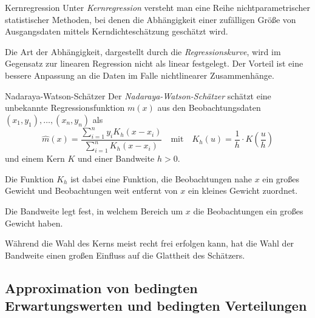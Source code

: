\begin{bonus}{Kernregression}
    Unter \emph{Kernregression} versteht man eine Reihe nichtparametrischer statistischer Methoden, bei denen die Abhängigkeit einer zufälligen Größe von Ausgangsdaten mittels Kerndichteschätzung geschätzt wird.

    Die Art der Abhängigkeit, dargestellt durch die \emph{Regressionskurve}, wird im Gegensatz zur linearen Regression nicht als linear festgelegt.
    Der Vorteil ist eine bessere Anpassung an die Daten im Falle nichtlinearer Zusammenhänge.
\end{bonus}

\begin{defi}[Kernregression]{Nadaraya-Watson-Schätzer}
    Der \emph{Nadaraya-Watson-Schätzer} schätzt eine unbekannte Regressionsfunktion $m(x)$ aus den Beobachtungsdaten $(x_{1},y_{1}),\dots ,(x_{n},y_{n})$ als
    \[
        \hat{m}(x)={\frac{\sum _{i=1}^{n}y_{i}K_{h}(x-x_{i})}{\sum _{i=1}^{n}K_{h}(x-x_{i})}} \quad \text{mit} \quad K_{h}(u)=\frac{1}{h}\cdot K\left(\frac{u}{h}\right)
    \]
    und einem Kern $K$ und einer Bandweite $h>0$.

    Die Funktion $K_{h}$ ist dabei eine Funktion, die Beobachtungen nahe $x$ ein großes Gewicht und Beobachtungen weit entfernt von $x$ ein kleines Gewicht zuordnet.

    Die Bandweite legt fest, in welchem Bereich um $x$ die Beobachtungen ein großes Gewicht haben.

    Während die Wahl des Kerns meist recht frei erfolgen kann, hat die Wahl der Bandweite einen großen Einfluss auf die Glattheit des Schätzers.
\end{defi}

\subsection{Approximation von bedingten Erwartungswerten und bedingten Verteilungen}

